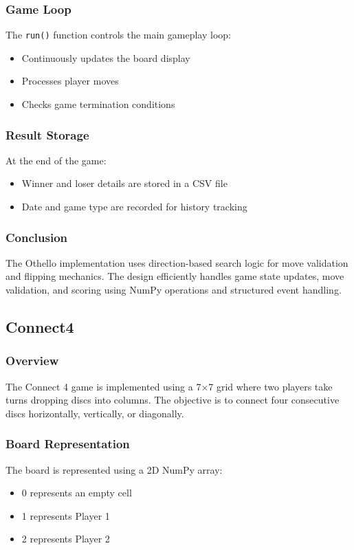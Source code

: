 \documentclass[12pt,letterpaper]{article}
\begin{document}
\subsubsection{Game Loop}
The \texttt{run()} function controls the main gameplay loop:
\begin{itemize}
\item Continuously updates the board display
\item Processes player moves
\item Checks game termination conditions
\end{itemize}
\subsubsection{Result Storage}
At the end of the game:
\begin{itemize}
\item Winner and loser details are stored in a CSV file
\item Date and game type are recorded for history tracking
\end{itemize}
\subsubsection{Conclusion}
The Othello implementation uses direction-based search logic for move validation and flipping 
mechanics. The design efficiently handles game state updates, move validation, and scoring using 
NumPy operations and structured event handling.
\subsection{Connect4}
\subsubsection{Overview}
The Connect 4 game is implemented using a 7×7 grid where two players take turns dropping discs 
into columns. The objective is to connect four consecutive discs horizontally, vertically, or 
diagonally.
\subsubsection{Board Representation}
The board is represented using a 2D NumPy array:
\begin{itemize}
\item 0 represents an empty cell
\item 1 represents Player 1
\item 2 represents Player 2
\end{itemize}
\end{document}
